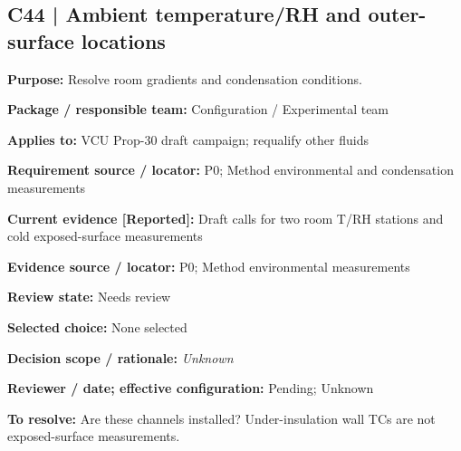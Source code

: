 \documentclass[11pt]{article}
\begin{document}
\par\noindent\begin{minipage}{\textwidth}\small\setlength{\parskip}{2pt}
\subsection*{C44 | Ambient temperature/RH and outer-surface locations}
\textbf{Purpose:} Resolve room gradients and condensation conditions.\par
\textbf{Package / responsible team:} Configuration / Experimental team\par
\textbf{Applies to:} VCU Prop-30 draft campaign; requalify other fluids\par
\textbf{Requirement source / locator:} P0; Method environmental and condensation measurements\par
\textbf{Current evidence [Reported]:} Draft calls for two room T/RH stations and cold exposed-surface measurements\par
\textbf{Evidence source / locator:} P0; Method environmental measurements\par
\textbf{Review state:} Needs review\par
\textbf{Selected choice:} None selected\par
\textbf{Decision scope / rationale:} \textit{Unknown}\par
\textbf{Reviewer / date; effective configuration:} Pending; Unknown\par
\textbf{To resolve:} Are these channels installed? Under-insulation wall TCs are not exposed-surface measurements.\par
\end{minipage}\par\vspace{5pt}
\end{document}
